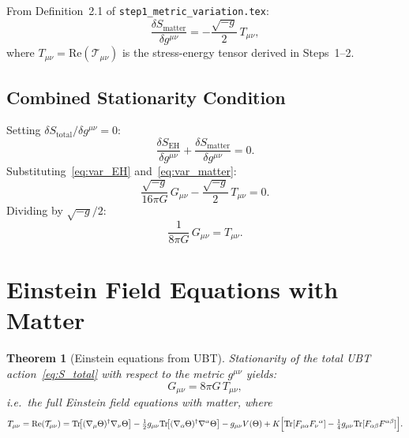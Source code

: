 \documentclass[12pt]{article}
\newtheorem{theorem}[definition]{Theorem}
\newcommand{\Tr}{\mathrm{Tr}}
\newcommand{\re}{\mathrm{Re}}
\begin{document}
From Definition~2.1 of \texttt{step1\_metric\_variation.tex}:
\begin{equation}
  \label{eq:var_matter}
  \frac{\delta S_{\mathrm{matter}}}{\delta g^{\mu\nu}}
  = -\frac{\sqrt{-g}}{2}\,T_{\mu\nu},
\end{equation}
where $T_{\mu\nu} = \re(\mathcal{T}_{\mu\nu})$ is the stress-energy tensor
derived in Steps~1--2.

\subsection{Combined Stationarity Condition}

Setting $\delta S_{\mathrm{total}}/\delta g^{\mu\nu} = 0$:
\begin{equation}
  \frac{\delta S_{\mathrm{EH}}}{\delta g^{\mu\nu}}
  + \frac{\delta S_{\mathrm{matter}}}{\delta g^{\mu\nu}} = 0.
\end{equation}
Substituting~\eqref{eq:var_EH} and~\eqref{eq:var_matter}:
\begin{equation}
  \frac{\sqrt{-g}}{16\pi G}\,G_{\mu\nu}
  - \frac{\sqrt{-g}}{2}\,T_{\mu\nu} = 0.
\end{equation}
Dividing by $\sqrt{-g}/2$:
\begin{equation}
  \frac{1}{8\pi G}\,G_{\mu\nu} = T_{\mu\nu}.
\end{equation}

\section{Einstein Field Equations with Matter}

\begin{theorem}[Einstein equations from UBT]
\label{thm:einstein}
Stationarity of the total UBT action~\eqref{eq:S_total} with respect to
the metric $g^{\mu\nu}$ yields:
\begin{equation}
  \label{eq:einstein_matter}
  \boxed{G_{\mu\nu} = 8\pi G\,T_{\mu\nu},}
\end{equation}
i.e.\ the full Einstein field equations \emph{with matter}, where
\begin{equation}
  T_{\mu\nu}
  = \re(\mathcal{T}_{\mu\nu})
  = \Tr\!\bigl[(\nabla_\mu\Theta)^\dagger\nabla_\nu\Theta\bigr]
    -\tfrac{1}{2}g_{\mu\nu}\Tr\!\bigl[(\nabla_\alpha\Theta)^\dagger
    \nabla^\alpha\Theta\bigr]
    - g_{\mu\nu}V(\Theta)
    + K\Bigl[\Tr[F_{\mu\alpha}F_\nu{}^\alpha]
      -\tfrac{1}{4}g_{\mu\nu}\Tr[F_{\alpha\beta}F^{\alpha\beta}]\Bigr].
\end{equation}
\end{theorem}
\end{document}
